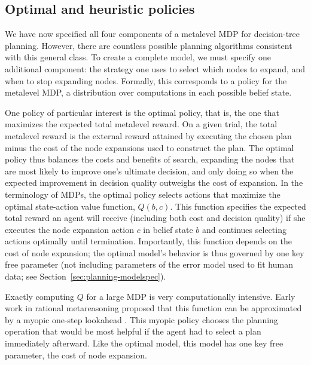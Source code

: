 
\subsection{Optimal and heuristic policies}
We have now specified all four components of a metalevel MDP for decision-tree planning. However, there are countless possible planning algorithms consistent with this general class. To create a complete model, we must specify one additional component: the strategy one uses to select which nodes to expand, and when to stop expanding nodes. Formally, this corresponds to a policy for the metalevel MDP, a distribution over computations in each possible belief state.

One policy of particular interest is the optimal policy, that is, the one that maximizes the expected total metalevel reward. On a given trial, the total metalevel reward is the external reward attained by executing the chosen plan minus the cost of the node expansions used to construct the plan. The optimal policy thus balances the costs and benefits of search, expanding the nodes that are most likely to improve one's ultimate decision, and only doing so when the expected improvement in decision quality outweighs the cost of expansion. In the terminology of MDPs, the optimal policy selects actions that maximize the optimal state-action value function, $Q(b, c)$. This function specifies the expected total reward an agent will receive (including both cost and decision quality) if she executes the node expansion action $c$ in belief state $b$ and continues selecting actions optimally until termination. Importantly, this function depends on the cost of node expansion; the optimal model's behavior is thus governed by one key free parameter (not including parameters of the error model used to fit human data; see Section~\ref{sec:planning-modelspec}).

Exactly computing $Q$ for a large MDP is very computationally intensive. Early work in rational metareasoning proposed that this function can be approximated by a myopic one-step lookahead \citep{russell1991principles}. This myopic policy chooses the planning operation that would be most helpful if the agent had to select a plan immediately afterward. Like the optimal model, this model has one key free parameter, the cost of node expansion.

